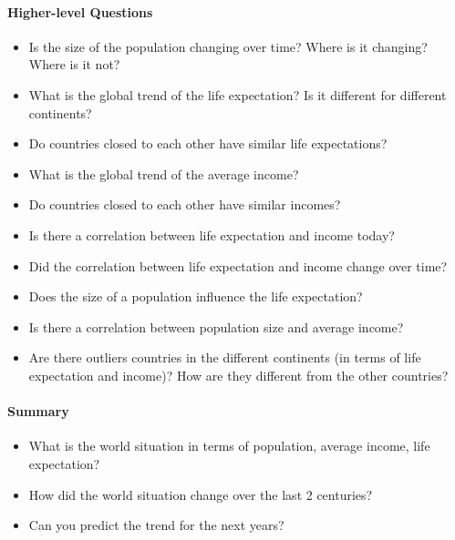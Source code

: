 \paragraph{Higher-level Questions}
\begin{itemize}

    \item Is the size of the population changing over time? Where is it changing? Where is it not?

    \item What is the global trend of the life expectation? Is it different for different continents?
    \item Do countries closed to each other have similar life expectations?    

    \item What is the global trend of the average income?
    \item Do countries closed to each other have similar incomes?    

    \item Is there a correlation between life expectation and income today?    
    \item Did the correlation between life expectation and income change over time?

    \item Does the size of a population influence the life expectation?
    \item Is there a correlation between population size and average income?

    \item Are there outliers countries in the different continents (in terms of life expectation and income)? How are they different from the other countries?

\end{itemize}

\paragraph{Summary}
\begin{itemize}
    \item What is the world situation in terms of population, average income, life expectation?
    \item How did the world situation change over the last 2 centuries?
    \item Can you predict the trend for the next years?
\end{itemize}


